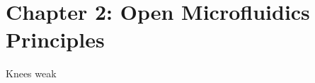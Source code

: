 \chapter{Chapter 2: Open Microfluidics Principles}\label{Chap:OpenMicrofluidicsPrinciples}

Knees weak